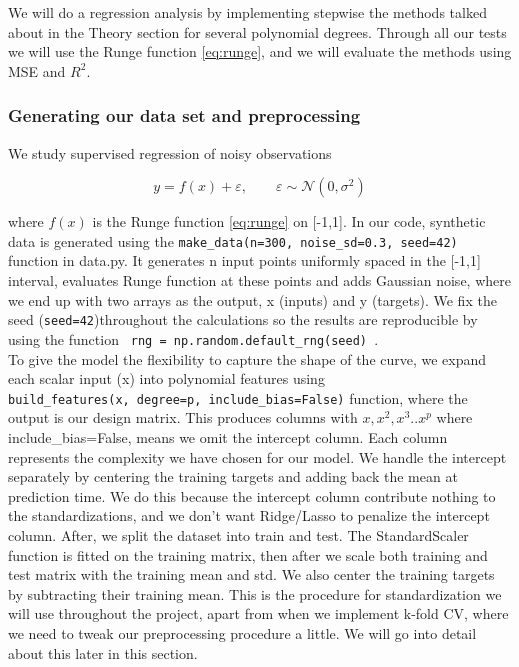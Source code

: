 \documentclass[amssymb,twocolumn,aps]{revtex4}
\begin{document}
We will do a regression analysis by implementing stepwise the methods talked about in the Theory section for several polynomial degrees. Through all our tests we will use the Runge function \eqref{eq:runge}, and we will evaluate the methods using MSE and $R^2$. 


\subsubsection{Generating our data set and preprocessing}
 \label{subsec:data}

We study supervised regression of noisy observations 

\begin{equation}
    y = f(x) + \varepsilon, \qquad \varepsilon \sim \mathcal{N}(0,\sigma^2)
\end{equation}

where $f(x)$ is the Runge function \eqref{eq:runge} on [-1,1]. In our code, synthetic data is generated using the \texttt{make\_data(n=300, noise\_sd=0.3, seed=42)} function in data.py. It generates n input points uniformly spaced in the [-1,1] interval, evaluates Runge function at these points and adds Gaussian noise, where we end up with two arrays as the output, x (inputs) and y (targets). We fix the seed (\texttt{seed=42})throughout the calculations so the results are reproducible by using the function \texttt{ rng = np.random.default\_rng(seed) }.  \\

To give the model the flexibility to capture the shape of the curve, we expand each scalar input (x) into polynomial features using \texttt{build\_features(x,\ degree=p,\ include\_bias=False)} function, where the output is our design matrix. This produces columns with $x, x^2, x^3 .. x^p$ where include\_bias=False, means we omit the intercept column. Each column represents the complexity we have chosen for our model. We handle the intercept separately by centering the training targets and adding back the mean at prediction time. We do this because the intercept column contribute nothing to the standardizations, and we don't want Ridge/Lasso to penalize the intercept column. After, we split the dataset into train and test. The StandardScaler function is fitted on the training matrix, then after we scale both training and test matrix with the training mean and std. We also center the training targets by subtracting their training mean. This is the procedure for standardization we will use throughout the project, apart from when we implement k-fold CV, where we need to tweak our preprocessing procedure a little. We will go into detail about this later in this section. \\
\end{document}
